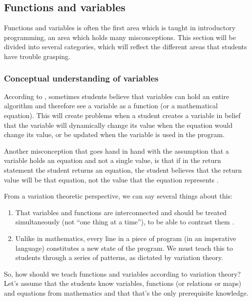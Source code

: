 \mode*
\subsection{Functions and variables}

Functions and variables is often the first area which is taught in 
introductory programming, an area which holds many misconceptions. This 
section will be divided into several categories, which will reflect the 
different areas that students have trouble grasping.  

\subsubsection{Conceptual understanding of variables}

According to \textcite{
Kohn2017VariableEvaluation,Plass2015Variables,Doukakis2007}, 
sometimes students believe that variables can hold an entire algorithm and 
therefore see a variable as a function (or a mathematical equation).
This will create problems when a student creates a variable in belief that the 
variable will dynamically change its value when the equation would change its 
value, or be updated when the variable is used in the program.

Another misconception that goes hand in hand with the assumption that a 
variable holds an equation and not a single value, is that if in the return 
statement the student returns an equation, the student believes that the return 
value will be that equation, not the value that the equation represents 
\parencite{Kohn2017VariableEvaluation}.

From a variation theoretic perspective, we can say several things about 
this:
\begin{enumerate}
  \item That variables and functions are interconnected and should be treated 
    simultaneously (not \enquote{one thing at a time}), to be able to contrast 
    them \parencite[\cf][Ch~6, pp~167--168]{NCOL}.
  \item Unlike in mathematics, every line in a piece of program (in an 
    imperative language) constitutes a new state of the program.
    We must teach this to students through a series of patterns, as dictated by 
    variation theory.
\end{enumerate}

So, how should we teach functions and variables according to variation theory?
Let's assume that the students know variables, functions (or relations or maps) 
and equations from mathematics and that that's the only prerequisite knowledge.

